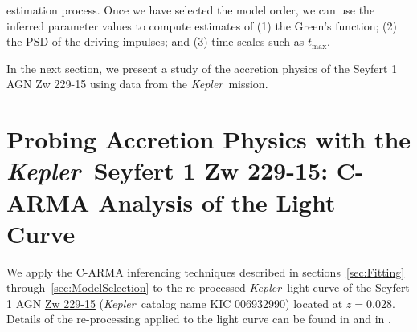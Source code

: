 \documentclass[a4paper,fleqn,usenatbib]{mnras}
\newcommand{\Kepler}{\textit{Kepler~}}
\begin{document}
estimation process. Once we have selected the model order, we can use the inferred parameter values to compute estimates of (1) the Green's function; (2) the PSD of the driving impulses; and (3) time-scales such as $t_\mathrm{max}$.

In the next section, we present a study of the accretion physics of the Seyfert 1 AGN Zw 229-15 using data from the \Kepler mission.

\section[C-ARMA Analysis of Zw 229-15]{Probing Accretion Physics with the \Kepler Seyfert 1 Zw 229-15: C-ARMA Analysis of the Light Curve}\label{sec:Zw229-15}

We apply the C-ARMA inferencing techniques described in sections~\ref{sec:Fitting} through~\ref{sec:ModelSelection} to the re-processed \Kepler light curve of the Seyfert 1 AGN \href{http://ned.ipac.caltech.edu/cgi-bin/objsearch?objname=Zw+229-15&extend=no&hconst=73&omegam=0.27&omegav=0.73&corr_z=1&out_csys=Equatorial&out_equinox=J2000.0&obj_sort=RA+or+Longitude&of=pre_text&zv_breaker=30000.0&list_limit=5&img_stamp=YES}{Zw 229-15} (\Kepler catalog name KIC 006932990) located at $z = 0.028$. Details of the re-processing applied to the light curve can be found in \citep{CariniWilliamsAAS} and in \citet{Kasliwal15b}.



\end{document}

